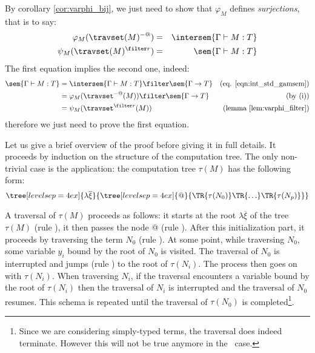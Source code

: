 \begin{remark}
\label{rem:corresp_proofreduction}
    By corollary \ref{cor:varphi_bij}, we just need to show that
    $\varphi_M$ defines \emph{surjections}, that is to
    say:
    \begin{eqnarray*}
    \varphi_M(\travset(M)^{-@}) &=& \intersem{\Gamma \vdash M : T} \\
    \psi_M(\travset(M)^{\filter r}) &=& \sem{\Gamma \vdash M :
    T}
    \end{eqnarray*}
    The first equation implies the second one, indeed:
    \begin{align*}
    \sem{\Gamma \vdash M : T} &= \intersem{\Gamma \vdash M : T} \filter \sem{\Gamma \rightarrow T} & \mbox{(eq. \ref{eqn:int_std_gamsem})} \\
            &= \varphi_M(\travset^{-@}(M)) \filter \sem{\Gamma \rightarrow T} & \mbox{(by (i))}\\
            &= \psi_M(\travset^{\filter r}(M)) & \mbox{(lemma \ref{lem:varphi_filter})}
    \end{align*}
    therefore we just need to prove the first equation.
\end{remark}

    Let us give a brief overview of the proof before giving it in full details.
    It proceeds by induction on the structure of the computation tree.
    The only non-trivial case is the application: the computation tree
    $\tau(M)$ has the following form:
        $$ \tree[levelsep=4ex]{\lambda \overline{\xi}}
            { \tree[levelsep=4ex]{@}
                {   \TR{\tau(N_0)} \TR{\ldots} \TR{\tau(N_p)}}}
        $$

    A traversal of $\tau(M)$ proceeds as follows: it starts at the root $\lambda \overline{\xi}$ of the tree $\tau(M)$ (rule ), it then passes the node @ (rule ).
    After this initialization part, it proceeds by traversing the term $N_0$ (rule ).
    At some point, while traversing $N_0$, some variable $y_i$ bound by the root of $N_0$ is visited. The traversal
    of $N_0$ is interrupted and jumps (rule ) to the root of $\tau(N_i)$. The process then goes on with $\tau(N_i)$.
    When traversing $N_i$, if the traversal encounters a variable bound by the root of $\tau(N_i)$ then the traversal of $N_i$
    is interrupted and
    the traversal of $N_0$ resumes.  This schema is repeated until the traversal of $\tau(N_0)$ is completed\footnote{Since we are considering
    simply-typed terms, the traversal does indeed terminate. However this will not be true anymore in the \pcf\ case.}.

